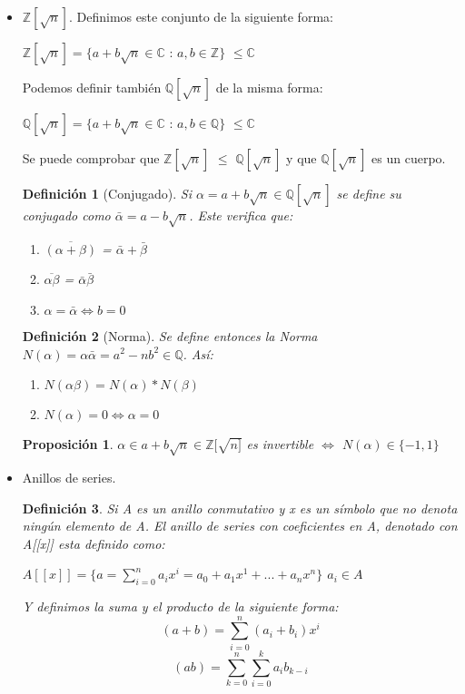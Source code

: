 \documentclass[11pt, a4paper, titlepage]{article}
\providecommand{\ent}{\mathbb{Z}}
\providecommand{\rac}{\mathbb{Q}}
\theoremstyle{theorem-style}
\newtheorem*{nprop}{Proposición}
\theoremstyle{definition-style}
\newtheorem*{ndef}{Definición}
\theoremstyle{remark-style}
\theoremstyle{example-style}
\begin{document}
\begin{itemize}
\item $\mathbb{Z}[\sqrt{n}]$.
Definimos este conjunto de la siguiente forma:
\begin{center}$\mathbb{Z}[\sqrt{n}] = \{a+b\sqrt{n} \in \mathbb{C}$ : $a,b \in \mathbb{Z} \}$ $\leq \mathbb{C}$\end{center}

Podemos definir también $\mathbb{Q}[\sqrt{n}]$ de la misma forma:

\begin{center}$\mathbb{Q}[\sqrt{n}] = \{a+b\sqrt{n} \in \mathbb{C}$ : $a,b \in \mathbb{Q} \}$ $\leq \mathbb{C}$\end{center}

Se puede comprobar que $\mathbb{Z}[\sqrt{n}]$ $\leq$ $\mathbb{Q}[\sqrt{n}]$ y que $\mathbb{Q}[\sqrt{n}]$ es un cuerpo.

\begin{ndef}[Conjugado]
	Si $\alpha = a+b\sqrt{n}\in \mathbb{Q}[\sqrt{n}]$ se define su conjugado como $\bar{\alpha} = a - b\sqrt{n}$. Este verifica que:
\begin{enumerate}

\item $ \overline{(\alpha+ \beta)} $ = $\bar{\alpha} + \bar{\beta}$
\item $\overline{\alpha \beta}$ = $\bar{\alpha}\bar{\beta}$
\item $\alpha = \bar{\alpha} \Leftrightarrow b = 0$
	
\end{enumerate} 
\end{ndef}

\begin{ndef}[Norma]
	Se define entonces la Norma $N(\alpha) = \alpha \bar{\alpha} = a^2 - nb^2 \in \rac $. Así:
\begin{enumerate}
	\item $N(\alpha \beta) = N(\alpha) * N(\beta)$
	\item $N(\alpha) = 0 \iff \alpha = 0$
\end{enumerate}
\end{ndef}


\begin{nprop}
	$\alpha \in a + b \sqrt{n} \in \ent[\sqrt{n]}$ es invertible $\iff$ $N(\alpha) \in \{-1,1\}$
\end{nprop}



\item Anillos de series.
\begin{ndef}
	Si A es un anillo conmutativo y x es un símbolo que no denota ningún elemento de A. El anillo de series con coeficientes en A, denotado con A[[x]] esta definido como:\begin{center}
$A[[x]] = \{a = \sum_{i=0}^{n}a_i x^i = a_0 + a_1 x^1 + ... + a_n x^n\}$ $a_i \in A$\end{center}
Y definimos la suma y el producto de la siguiente forma:\\
\[(a+b) = \sum_{i=0}^{n}(a_i+b_i)x^i\]\[ (ab) = \sum_{k=0}^n\sum_{i=0}^{k}a_ib_{k-i}\]
\end{ndef}
\end{itemize}
\end{document}
